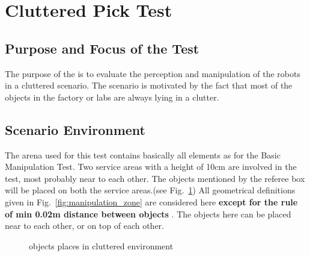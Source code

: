 \newpage
\section{Cluttered Pick Test}

\subsection{Purpose and Focus of the Test}
The purpose of the  is to evaluate the perception
and manipulation of the robots in a cluttered scenario. The scenario is motivated by
the fact that most of the objects in the factory or labs are always lying in a clutter.


\subsection{Scenario Environment}
The arena used for this test contains basically all elements as for the Basic
Manipulation Test. Two service areas with a height of 10cm are involved in the test,
most probably near to each other. The objects mentioned by the referee box will be placed
on both the service areas.(see Fig.~\ref{fig:clutter})  
All geometrical definitions given in Fig.~\ref{fig:manipulation_zone} are considered here \textbf{except 
for the rule of min 0.02m distance between objects} . The objects here can be placed near to each other,
or on top of each other. 

\begin{figure} [h!]
\begin{center}
 \hspace{1cm}
\end{center}
\caption{objects places in cluttered environment}
\label{fig:clutter}
\end{figure}


